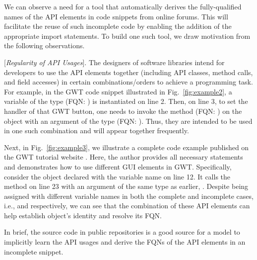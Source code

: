 We can observe a need for a tool that automatically derives the fully-qualified names of the API elements in code snippets from online forums. This will facilitate the reuse of such incomplete code by enabling the addition of the appropriate import statements. To build one such tool, we draw motivation from the following observations.

\vspace{2pt}
 [{\em Regularity of API Usages}]. The designers of software libraries intend for developers to use the API elements together (including API classes, method calls, and field accesses) in certain combinations/orders to achieve a programming task. For example, in the GWT code snippet illustrated in Fig.~\ref{fig:example2}, a variable of the type  (FQN: ) is instantiated on line 2. Then, on line 3, to set the handler of that GWT button, one needs to invoke the  method (FQN: )  on the  object with an argument of the type  (FQN: ). Thus,
they are intended to be used in one such combination and will appear together frequently.

Next, in Fig.~\ref{fig:example3}, we illustrate a complete code example published on the GWT tutorial website . Here, the author provides all necessary  statements and demonstrates how to use different GUI elements in GWT. Specifically, consider the  object declared with the  variable name on line 12. It calls the method  on line 23 with an argument of the same type as earlier, . 
Despite being assigned with different variable names in both the complete and incomplete cases, i.e.,  and  respectively, we can see that the combination of these API elements can help establish  object's identity and resolve its FQN.

In brief, the source code in public repositories is a good source for a model to implicitly learn the API usages and derive the FQNs of the API elements in an incomplete snippet.

